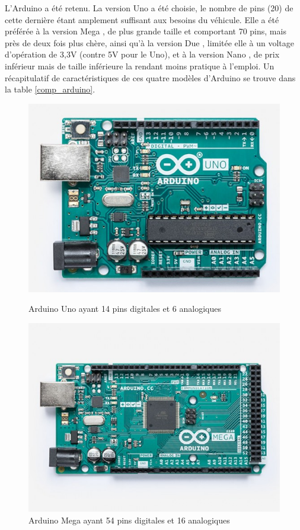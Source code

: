 \documentclass[a4paper,11pt]{article}
\begin{document}
L'Arduino a été retenu. La version Uno \cite{Arduino_uno} a été choisie, le nombre de pins (20) de cette dernière étant amplement suffisant aux besoins du véhicule. Elle a été préférée à la version Mega \cite{Arduino_mega}, de plus grande taille et comportant 70 pins, mais près de deux fois plus chère, ainsi qu'à la version Due \cite{Arduino_due}, limitée elle à un voltage d’opération de 3,3V (contre 5V pour le Uno), et à la version Nano \cite{Arduino_nano}, de prix inférieur mais de taille inférieure la rendant moins pratique à l'emploi. Un récapitulatif de caractéristiques de ces quatre modèles d'Arduino se trouve dans la table \ref{comp_arduino}.


\begin{figure}[H]
    \begin{minipage}[c]{.46\linewidth}
    \centering
    \includegraphics[scale = 0.4]{arduino_uno.jpg}
    \caption{Arduino Uno ayant 14 pins digitales et 6 analogiques \cite{arduno}}
    \label{fig:Uno}
    \end{minipage}
    \hfill
    \begin{minipage}[c]{.46\linewidth}
    \centering
    \includegraphics[scale = 0.4]{arduino_mega.jpg}
    \caption{Arduino Mega ayant 54 pins digitales et 16 analogiques \cite{ardmega}}
    \label{fig:Mega}
    \end{minipage}
\end{figure}
\end{document}
